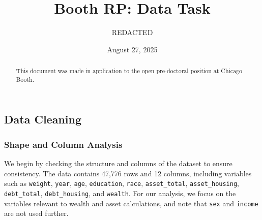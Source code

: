 \documentclass[
  12pt]{article}
\renewcommand*\contentsname{Table of contents}
\newcommand\contentsname{Table of contents}
\begin{document}
\def\spacingset#1{\renewcommand{\baselinestretch}%
{#1}\small\normalsize} \spacingset{1}



\date{August 27, 2025}
\title{\bf Booth RP: Data Task}
\author{
REDACTED\\
}
\maketitle

\bigskip
\bigskip
\begin{abstract}
This document was made in application to the open pre-doctoral position
at Chicago Booth.
\end{abstract}


\newpage
\spacingset{1} %

\renewcommand*\contentsname{Table of contents}
{
\hypersetup{linkcolor=}
\setcounter{tocdepth}{3}
\tableofcontents
}
\subsection{Data Cleaning}\label{data-cleaning}

\subsubsection{Shape and Column
Analysis}\label{shape-and-column-analysis}

We begin by checking the structure and columns of the dataset to ensure
consistency. The data contains 47,776 rows and 12 columns, including
variables such as \texttt{weight}, \texttt{year}, \texttt{age},
\texttt{education}, \texttt{race}, \texttt{asset\_total},
\texttt{asset\_housing}, \texttt{debt\_total}, \texttt{debt\_housing},
and \texttt{wealth}. For our analysis, we focus on the variables
relevant to wealth and asset calculations, and note that \texttt{sex}
and \texttt{income} are not used further.
\end{document}
